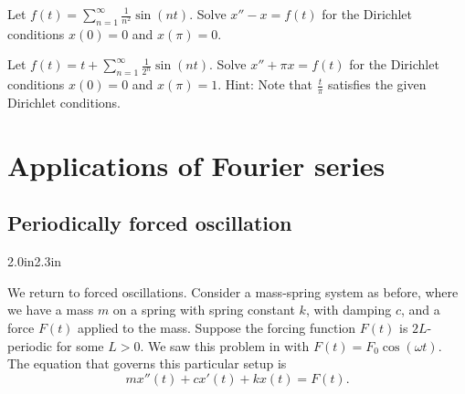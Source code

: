 \begin{exercise}
Let $f(t) = \sum_{n=1}^\infty \frac{1}{n^2} \sin(nt)$.  Solve
$x''- x = f(t)$ for the Dirichlet conditions $x(0) = 0$
and $x(\pi) = 0$.
\end{exercise}

\begin{exercise}[challenging]
Let $f(t) = t + \sum_{n=1}^\infty \frac{1}{2^n} \sin(nt)$.  Solve
$x'' + \pi x = f(t)$ for the Dirichlet conditions $x(0) = 0$
and $x(\pi) = 1$.  Hint:  Note that $\frac{t}{\pi}$ satisfies the
given Dirichlet conditions.
\end{exercise}



\sectionnewpage
\section{Applications of Fourier series}
\label{appoffourier:section}



\subsection{Periodically forced oscillation}

\begin{mywrapfigsimp}{2.0in}{2.3in}
\noindent
{}
\end{mywrapfigsimp}
We return to forced oscillations.  Consider a mass-spring system as
before, where we have a mass $m$
on a spring with spring constant $k$,
with damping $c$, and a force $F(t)$ applied to the mass.  Suppose 
the forcing function $F(t)$ is $2L$-periodic for some $L > 0$.
We saw
this problem in  with $F(t) = F_0 \cos (\omega t)$.  The
equation that governs this particular setup is
\begin{equation} \label{afs:eq}
mx''(t) + cx'(t) + kx(t) = F(t) .
\end{equation}

